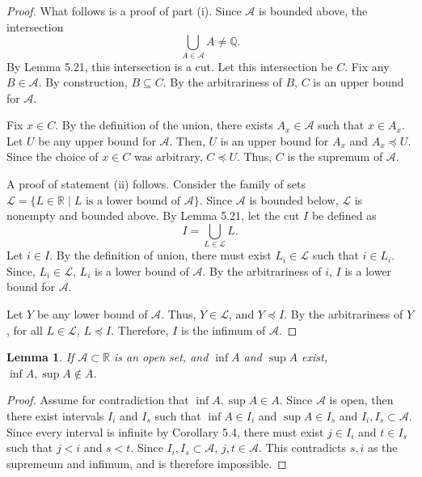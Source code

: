 \documentclass{amsart}
\newtheorem{lemma}[theorem]{Lemma}
\newcommand{\Q}{\mathbb Q}
\newcommand{\R}{\mathbb R}
\newcommand{\1}{\mathds{1}}
\newcommand{\cA}{\mathcal A}
\def \R {{\mathbb {R}}}
\numberwithin{equation}{section}
\numberwithin{theorem}{section}
\begin{document}
\begin{proof}
	What follows is a proof of part (i). Since $\cA$ is bounded above, the intersection $$\bigcup_{A\in\cA}A \not=\Q.$$ By Lemma 5.21, this intersection is a cut. Let this intersection be $C$. Fix any $B\in\cA$. By construction, $B\subseteq C$. By the arbitrariness of $B$, $C$ is an upper bound for $\cA$. 
	
	Fix $x\in C$. By the definition of the union, there exists $A_x \in \cA$ such that $x\in A_x$. Let $U$ be any upper bound for $\cA$. Then, $U$ is an upper bound for $A_x$ and $A_x\preceq U$. Since the choice of $x\in C$ was arbitrary, $C\preceq U$. Thus, $C$ is the supremum of $\cA$.
	
	A proof of statement (ii) follows. Consider the family of sets $\mathcal{L} = \{L\in \R \mid L \text{ is a lower bound of } \cA\}$. Since $\cA$ is bounded below, $\mathcal{L}$ is nonempty and bounded above. By Lemma 5.21, let the cut $I$ be defined as $$I = \bigcup_{L\in\mathcal{L}}L.$$ Let $i\in I$. By the definition of union, there must exist $L_i\in \mathcal{L}$ such that $i\in L_i$. Since, $L_i\in \mathcal{L}$, $L_i$ is a lower bound of $\cA$. By the arbitrariness of $i$, $I$ is a lower bound for $\cA$.
	
	Let $Y$ be any lower bound of $\cA$. Thus, $Y\in \mathcal{L}$, and $Y\preceq I$. By the arbitrariness of $Y$, for all $L\in \mathcal{L}$, $L\preceq I$. Therefore, $I$ is the infimum of $\cA$.  
\end{proof}

\begin{lemma}
	If $\cA\subset \R$ is an open set, and $\inf A$ and $\sup A$ exist, $\inf A,\sup A\notin A$.
\end{lemma}

\begin{proof}
	Assume for contradiction that $\inf A,\sup A\in A$. Since $\cA$ is open, then there exist intervals $I_i$ and $I_s$ such that $\inf A \in I_i$ and $\sup A \in I_s$ and $I_i,I_s\subset \cA$. Since every interval is infinite by Corollary 5.4, there must exist $j\in I_i$ and $t\in I_s$ such that $j<i$ and $s<t$. Since $I_i,I_s\subset \cA$, $j,t\in \cA$. This contradicts $s,i$ as the supremeum and infimum, and is therefore impossible.
\end{proof}



\end{document}
